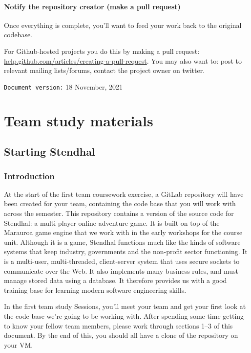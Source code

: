 \documentclass[
]{book}
\begin{document}
\hypertarget{pullrequest}{%
\subsection{Notify the repository creator (make a pull request)}\label{pullrequest}}

Once everything is complete, you'll want to feed your work back to the original codebase.

For Github-hosted projects you do this by making a pull request: \href{https://help.github.com/articles/creating-a-pull-request}{help.github.com/articles/creating-a-pull-request}. You may also want to: post to relevant mailing lists/forums, contact the project owner on twitter.

\texttt{Document\ version:} 18 November, 2021

\hypertarget{part-team-study-materials}{%
\part{Team study materials}\label{part-team-study-materials}}

\hypertarget{starting}{%
\chapter{Starting Stendhal}\label{starting}}

\hypertarget{introduction-2}{%
\section{Introduction}\label{introduction-2}}

At the start of the first team coursework exercise, a GitLab repository will have been created for your team, containing the code base that you will work with across the semester. This repository contains a version of the source code for Stendhal: a multi-player online adventure game. It is built on top of the Marauroa game engine that we work with in the early workshops for the course unit. Although it is a game, Stendhal functions much like the kinds of software systems that keep industry, governments and the non-profit sector functioning. It is a multi-user, multi-threaded, client-server system that uses secure sockets to communicate over the Web. It also implements many business rules, and must manage stored data using a database. It therefore provides us with a good training base for learning modern software engineering skills.

In the first team study Sessions, you'll meet your team and get your first look at the code base we're going to be working with. After spending some time getting to know your fellow team members, please work through sections 1--3 of this document. By the end of this, you should all have a clone of the repository on your VM.
\end{document}
